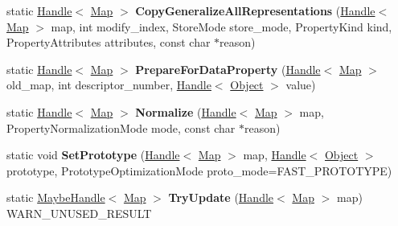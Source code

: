 \begin{DoxyCompactItemize}
\item 
static \hyperlink{classv8_1_1internal_1_1_handle}{Handle}$<$ \hyperlink{classv8_1_1internal_1_1_map}{Map} $>$ {\bfseries Copy\+Generalize\+All\+Representations} (\hyperlink{classv8_1_1internal_1_1_handle}{Handle}$<$ \hyperlink{classv8_1_1internal_1_1_map}{Map} $>$ map, int modify\+\_\+index, Store\+Mode store\+\_\+mode, Property\+Kind kind, Property\+Attributes attributes, const char $\ast$reason)\hypertarget{classv8_1_1internal_1_1_map_ac5c52243f44c48bc067ea1ef29e1e09b}{}\label{classv8_1_1internal_1_1_map_ac5c52243f44c48bc067ea1ef29e1e09b}

\item 
static \hyperlink{classv8_1_1internal_1_1_handle}{Handle}$<$ \hyperlink{classv8_1_1internal_1_1_map}{Map} $>$ {\bfseries Prepare\+For\+Data\+Property} (\hyperlink{classv8_1_1internal_1_1_handle}{Handle}$<$ \hyperlink{classv8_1_1internal_1_1_map}{Map} $>$ old\+\_\+map, int descriptor\+\_\+number, \hyperlink{classv8_1_1internal_1_1_handle}{Handle}$<$ \hyperlink{classv8_1_1internal_1_1_object}{Object} $>$ value)\hypertarget{classv8_1_1internal_1_1_map_a7fabe82dd0314c8bafd3d796dc0d7922}{}\label{classv8_1_1internal_1_1_map_a7fabe82dd0314c8bafd3d796dc0d7922}

\item 
static \hyperlink{classv8_1_1internal_1_1_handle}{Handle}$<$ \hyperlink{classv8_1_1internal_1_1_map}{Map} $>$ {\bfseries Normalize} (\hyperlink{classv8_1_1internal_1_1_handle}{Handle}$<$ \hyperlink{classv8_1_1internal_1_1_map}{Map} $>$ map, Property\+Normalization\+Mode mode, const char $\ast$reason)\hypertarget{classv8_1_1internal_1_1_map_af7daafd686f8b45d93c8d7e50c542f6b}{}\label{classv8_1_1internal_1_1_map_af7daafd686f8b45d93c8d7e50c542f6b}

\item 
static void {\bfseries Set\+Prototype} (\hyperlink{classv8_1_1internal_1_1_handle}{Handle}$<$ \hyperlink{classv8_1_1internal_1_1_map}{Map} $>$ map, \hyperlink{classv8_1_1internal_1_1_handle}{Handle}$<$ \hyperlink{classv8_1_1internal_1_1_object}{Object} $>$ prototype, Prototype\+Optimization\+Mode proto\+\_\+mode=F\+A\+S\+T\+\_\+\+P\+R\+O\+T\+O\+T\+Y\+PE)\hypertarget{classv8_1_1internal_1_1_map_a3023486afd2c326e4867eed5481ad6fe}{}\label{classv8_1_1internal_1_1_map_a3023486afd2c326e4867eed5481ad6fe}

\item 
static \hyperlink{classv8_1_1internal_1_1_maybe_handle}{Maybe\+Handle}$<$ \hyperlink{classv8_1_1internal_1_1_map}{Map} $>$ {\bfseries Try\+Update} (\hyperlink{classv8_1_1internal_1_1_handle}{Handle}$<$ \hyperlink{classv8_1_1internal_1_1_map}{Map} $>$ map) W\+A\+R\+N\+\_\+\+U\+N\+U\+S\+E\+D\+\_\+\+R\+E\+S\+U\+LT\hypertarget{classv8_1_1internal_1_1_map_a5cb0a0263bdf3346ea83a0fe60dece33}{}\label{classv8_1_1internal_1_1_map_a5cb0a0263bdf3346ea83a0fe60dece33}


\end{DoxyCompactItemize}
